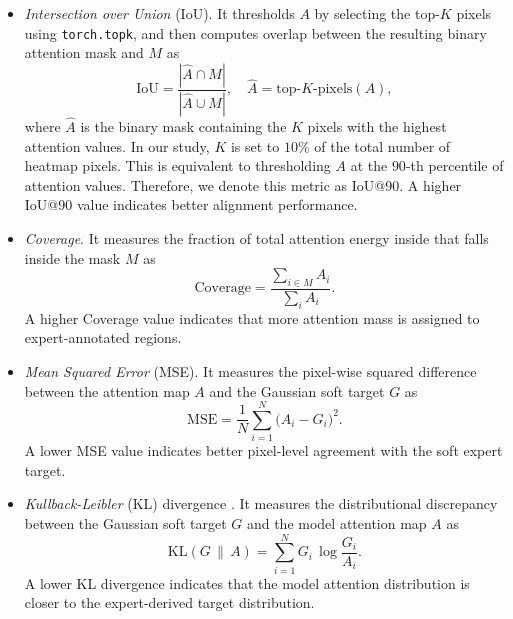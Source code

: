 \documentclass[lineno,pdflatex,sn-mathphys-num]{sn-jnl}%
\theoremstyle{thmstyleone}%
\theoremstyle{thmstyletwo}%
\theoremstyle{thmstylethree}%
\begin{document}
\begin{itemize}
\item \textit{Intersection over Union} (IoU). It thresholds $A$ by selecting the top-$K$ pixels using \texttt{torch.topk}, and then computes overlap between the resulting binary attention mask and $M$ as
\begin{equation}
\mathrm{IoU} = \frac{|\hat{A} \cap M|}{|\hat{A} \cup M|},
\quad \hat{A} = \text{top-}K\text{-pixels}(A),
\label{eq:iou}
\end{equation}
where $\hat{A}$ is the binary mask containing the $K$ pixels with the highest attention values. In our study, $K$ is set to $10\%$ of the total number of heatmap pixels. This is equivalent to thresholding $A$ at the
$90$-th percentile of attention values. Therefore, we denote this metric as IoU@90. A higher IoU@90 value indicates better alignment performance.

\item \textit{Coverage}. It measures the fraction of total attention energy inside that falls inside the mask $M$ as
\begin{equation}
\text{Coverage} = \frac{\sum_{i \in M} A_i}{\sum_i A_i}.
\end{equation}
A higher Coverage value indicates that more attention mass is assigned to expert-annotated regions.

\item \textit{Mean Squared Error} (MSE). It measures the pixel-wise squared difference between the attention map $A$ and the Gaussian soft target $G$ as
\begin{equation}
\mathrm{MSE} = \frac{1}{N}\sum_{i=1}^{N}
\bigl(A_i - G_i\bigr)^{2}.
\end{equation}
A lower MSE value indicates better pixel-level agreement with the soft expert target.

\item \textit{Kullback-Leibler} (KL) divergence \cite{Kullback1951}. It measures the distributional discrepancy between the Gaussian soft target $G$ and the model attention map $A$ as
\begin{equation}
\mathrm{KL}(G \,\|\, A) = \sum_{i=1}^{N} G_i \,
\log\frac{G_i}{A_i}.
\end{equation}
A lower KL divergence indicates that the model attention distribution is closer to the expert-derived target distribution.


\end{itemize}
\end{document}

